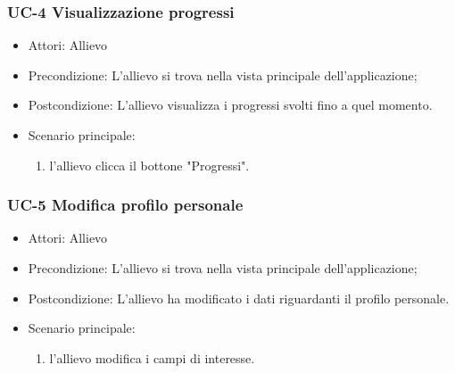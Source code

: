 	\subsubsection{UC-4 Visualizzazione progressi}
	\begin{itemize}
			\item Attori: Allievo
			\item Precondizione: L'allievo si trova nella vista principale dell'applicazione;
			\item Postcondizione: L'allievo visualizza i progressi svolti fino a quel momento.
			\item Scenario principale:
				\begin{enumerate}
					\item l'allievo clicca il bottone "Progressi".
				\end{enumerate}
			\end{itemize}
	\subsubsection{UC-5 Modifica profilo personale}
	\begin{itemize}
			\item Attori: Allievo
			\item Precondizione: L'allievo si trova nella vista principale dell'applicazione;
			\item Postcondizione: L'allievo ha modificato i dati riguardanti il profilo personale.
			\item Scenario principale:
				\begin{enumerate}
					\item l'allievo modifica i campi di interesse.
				\end{enumerate}
	\end{itemize}